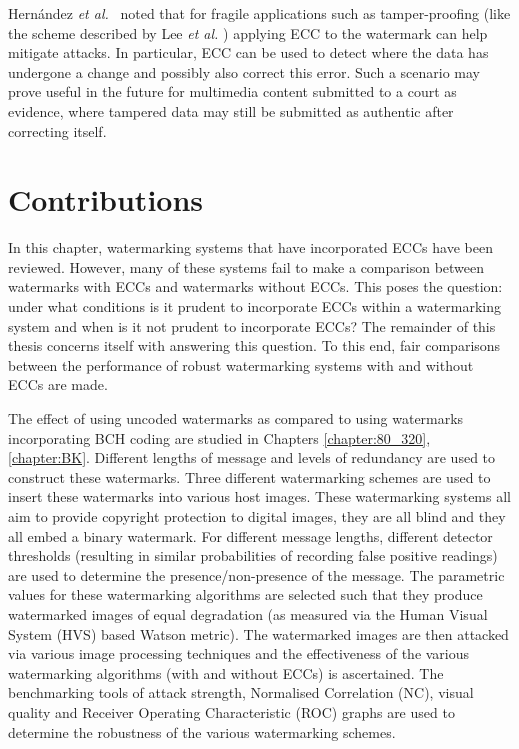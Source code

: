 \documentclass[12pt]{report}
\begin{document}
Hern\'andez \emph{et al.}~\cite{ECCb4:th1} noted that for fragile applications such as tamper-proofing (like the
scheme described by
Lee \emph{et al.} \cite{ECCb4:lee}) applying ECC to the watermark can help mitigate attacks. In particular, ECC can be used 
to detect where the data has undergone a change and possibly also correct this error. Such a scenario may
prove useful in the future for multimedia content submitted to a court as evidence, where tampered data may still be submitted
as authentic after correcting itself. 

\section{Contributions}
In this chapter, watermarking systems that have incorporated ECCs have been reviewed. However, 
many of these systems fail to make a comparison between watermarks with ECCs and watermarks without ECCs.
This poses the question: under what conditions is it prudent to incorporate ECCs within a watermarking system 
and when is it not prudent to incorporate ECCs? The remainder of this thesis concerns itself with answering this 
question. To this end, fair comparisons between the performance of robust watermarking systems with and without ECCs are made.

The effect of using uncoded watermarks as compared to using watermarks incorporating BCH coding are
studied in Chapters 
\ref{chapter:80_320},
\ref{chapter:BK}.
Different lengths of message and levels of redundancy are used to construct these
watermarks. Three different watermarking schemes are used to insert these watermarks into various
host images. 
These watermarking systems all aim to provide copyright protection to digital images, they
are all blind and they all embed a binary watermark.
For different message lengths, different detector thresholds (resulting in similar 
probabilities of recording false positive readings) are used to determine the
presence/non-presence of the message. The parametric values for these watermarking algorithms
are selected such that they produce watermarked images of equal degradation (as measured via 
the Human Visual System (HVS) based Watson metric).
The watermarked images are then attacked via various image processing techniques and the
effectiveness of the various watermarking algorithms (with and without ECCs) is ascertained.
The benchmarking tools of attack strength, Normalised Correlation (NC), visual quality and
Receiver Operating Characteristic (ROC) graphs are used to determine the robustness of the various watermarking
schemes.
\end{document}
